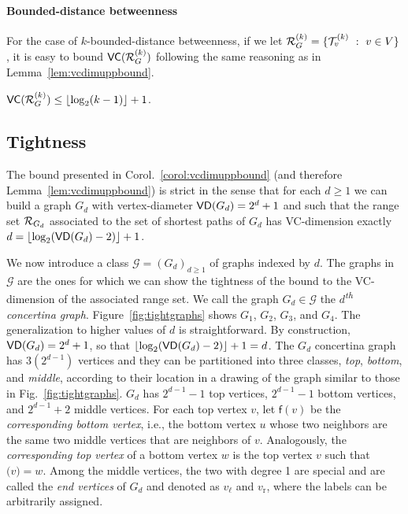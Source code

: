 \fi

\ifproof
\else
\paragraph{Bounded-distance betweenness}
For the case of $k$-bounded-distance betweenness, if we let
$\mathcal{R}_G^{(k)}=\{\mathcal{T}_v^{(k)}~:~ v\in V\}$, it is easy to bound
$\mathsf{VC}(\mathcal{R}_G^{(k)})$ following the same reasoning as in
Lemma~\ref{lem:vcdimuppbound}.
\begin{lemma}\label{lem:vcdimuppboundk}
$\mathsf{VC}(\mathcal{R}_G^{(k)})\le\lfloor\log_2(k-1)\rfloor+1$.
\end{lemma}
\fi

\subsection{Tightness}\label{sec:tightness}
The bound presented in Corol.~\ref{corol:vcdimuppbound} (and therefore
Lemma~\ref{lem:vcdimuppbound}) is strict in the sense that
for each $d\ge 1$ we can build a graph $G_d$ with vertex-diameter
$\mathsf{VD}(G_d)=2^d+1$ and such that the range set $\mathcal{R}_{G_d}$ associated to the set of
shortest paths of $G_d$ has VC-dimension exactly
$d=\lfloor\log_2(\mathsf{VD}(G_d)-2)\rfloor+1$. 

\ifproof
We now introduce a class $\mathcal{G}=(G_d)_{d\ge 1}$ of graphs indexed by $d$.
The graphs in $\mathcal{G}$ are the ones for which we can show the tightness of
the bound to the VC-dimension of the associated range set.
We call the graph $G_d\in\mathcal{G}$ the \emph{$d$\textsuperscript{th} concertina graph}.
Figure~\ref{fig:tightgraphs} shows $G_1$, $G_2$, $G_3$, and $G_4$. The
generalization to higher values of $d$ is straightforward.
By construction, $\mathsf{VD}(G_d)=2^d+1$, so that
$\lfloor\log_2(\mathsf{VD}(G_d)-2)\rfloor+1=d$. The $G_d$ concertina graph has 
$3(2^{d-1})$ vertices and they can be partitioned into three classes,
\emph{top}, \emph{bottom}, and \emph{middle},
according to their location in a drawing of the graph similar to those in
Fig.~\ref{fig:tightgraphs}. $G_d$ has $2^{d-1}-1$ top vertices, $2^{d-1}-1$
bottom vertices, and $2^{d-1}+2$ middle vertices. For each top vertex $v$, let
$\mathsf{f}(v)$ be the \emph{corresponding bottom vertex}, i.e., the bottom
vertex $u$ whose two neighbors are the same two middle vertices that are
neighbors of $v$. Analogously, the \emph{corresponding top vertex} of a bottom
vertex $w$ is the top vertex $v$ such that $\mathsf(v)=w$. Among the middle
vertices, the two with degree 1 are special and are called the \emph{end
vertices} of $G_d$ and denoted as $v_\ell$ and $v_\mathrm{r}$, where the labels
can be arbitrarily assigned. 

